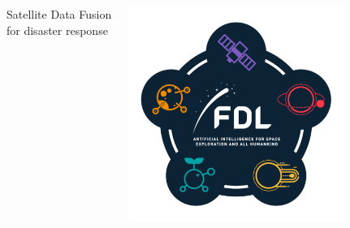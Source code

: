 \documentclass[%
  aspectratio=169,
  9pt,
  USenglish,
  titlegraphic, %
  affiliationintitlepagehead,
  affiliation,
]{beamer}
\begin{document}
{
	\begin{frame}[plain]
	
	\vfill
	\Huge\color{white}
	\begin{center}
		\begin{columns}
			\vspace{3.5em}
			
			\hfill Satellite Data Fusion \\ \hfill for disaster response
			
			\includegraphics[width=7cm]{images/fdl}
		\end{columns}
	\end{center}
	
	\vfill
\end{frame}
}


\end{document}
